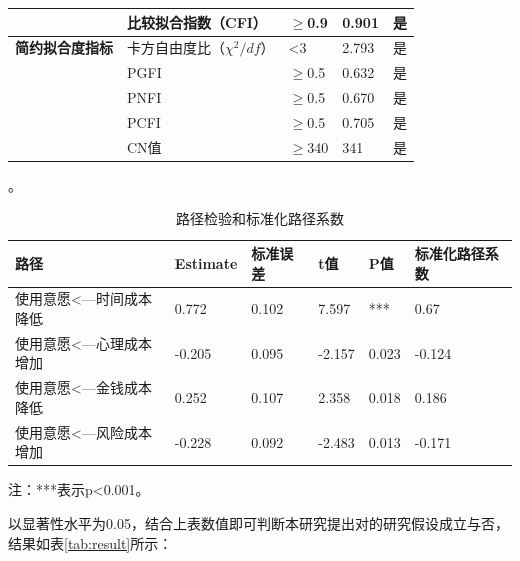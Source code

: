 \begin{table}[H]
\begin{tabular}{@{}lllll@{}}
\textbf{}        & 比较拟合指数（CFI）           & $\geq$0.9       & 0.901           & 是               \\ \midrule
\textbf{简约拟合度指标} & 卡方自由度比（$\chi^{2}/df$） & \textless{}3    & 2.793           & 是               \\
\textbf{}        & PGFI                  & $\geq$0.5       & 0.632           & 是               \\
\textbf{}        & PNFI                  & $\geq$0.5       & 0.670           & 是               \\
\textbf{}        & PCFI                  & $\geq$0.5       & 0.705           & 是               \\
\textbf{}        & CN值                   & $\geq$340       & 341             & 是               \\ \bottomrule
\end{tabular}
\end{table}
。
\begin{table}[H]
\centering
\caption{路径检验和标准化路径系数}
\label{tab:road}
\begin{threeparttable}
\begin{tabular}{@{}llllll@{}}
\toprule
\textbf{路径}              & \textbf{Estimate} & \textbf{标准误差} & \textbf{t值} & \textbf{P值} & \textbf{标准化路径系数} \\ \midrule
使用意愿\textless{}---时间成本降低 & 0.772             & 0.102         & 7.597       & ***         & 0.67             \\
使用意愿\textless{}---心理成本增加 & -0.205            & 0.095         & -2.157      & 0.023       & -0.124           \\
使用意愿\textless{}---金钱成本降低 & 0.252             & 0.107         & 2.358       & 0.018       & 0.186            \\
使用意愿\textless{}---风险成本增加 & -0.228            & 0.092         & -2.483      & 0.013       & -0.171           \\ \bottomrule
\end{tabular}
\begin{tablenotes}
    \item 注：***表示p<0.001。
\end{tablenotes}
\end{threeparttable}
\end{table}
以显著性水平为0.05，结合上表数值即可判断本研究提出对的研究假设成立与否，结果如表\ref{tab:result}所示：
